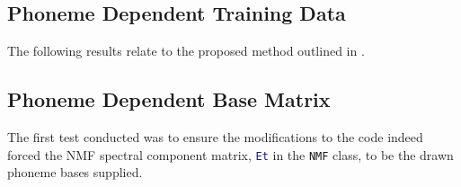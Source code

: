 \subsection{Phoneme Dependent Training Data}

The following results relate to the proposed method outlined in .


\subsection{Phoneme Dependent Base Matrix}

The first test conducted was to ensure the modifications to the code
indeed forced the \ac{NMF} spectral component matrix, \lstinline[language=Matlab]!Et!
in the \lstinline[language=bash]!NMF! class, to be the drawn phoneme
bases supplied.
